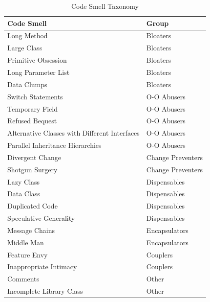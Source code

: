 \begin{table}[]
\centering
\caption{Code Smell Taxonomy}
\label{tab:codesmell}
\begin{tabular}{|l|l|}
\hline
\textbf{Code Smell}                           & \textbf{Group}    \\ \hline
Long Method                                   & Bloaters          \\ \hline
Large Class                                   & Bloaters          \\ \hline
Primitive Obsession                           & Bloaters          \\ \hline
Long Parameter List                           & Bloaters          \\ \hline
Data Clumps                                   & Bloaters          \\ \hline
Switch Statements                             & O-O Abusers       \\ \hline
Temporary Field                               & O-O Abusers       \\ \hline
Refused Bequest                               & O-O Abusers       \\ \hline
Alternative Classes with Different Interfaces & O-O Abusers       \\ \hline
Parallel Inheritance Hierarchies              & O-O Abusers       \\ \hline
Divergent Change                              & Change Preventers \\ \hline
Shotgun Surgery                               & Change Preventers \\ \hline
Lazy Class                                    & Dispensables      \\ \hline
Data Class                                    & Dispensables      \\ \hline
Duplicated Code                               & Dispensables      \\ \hline
Speculative Generality                        & Dispensables      \\ \hline
Message Chains                                & Encapsulators     \\ \hline
Middle Man                                    & Encapsulators     \\ \hline
Feature Envy                                  & Couplers          \\ \hline
Inappropriate Intimacy                        & Couplers          \\ \hline
Comments                                      & Other             \\ \hline
Incomplete Library Class                      & Other             \\ \hline
\end{tabular}
\end{table}

